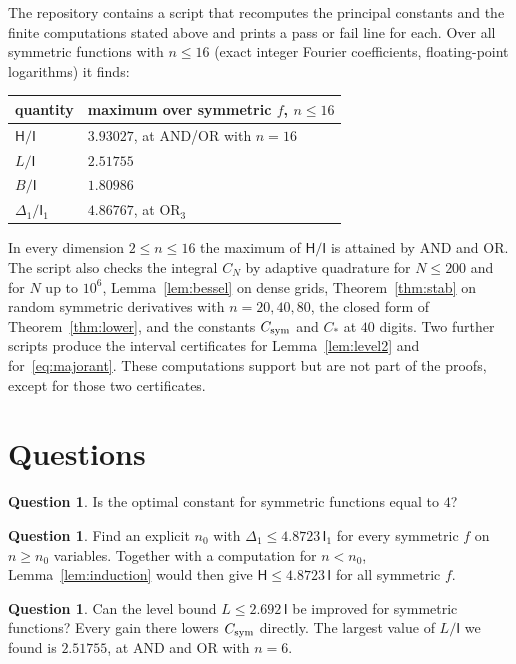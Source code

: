\documentclass[11pt]{amsart}
\theoremstyle{definition}
\newtheorem{question}[theorem]{Question}
\theoremstyle{remark}
\newcommand{\HH}{\mathsf H}
\newcommand{\I}{\mathsf I}
\begin{document}
The repository contains a script that recomputes the principal constants and the finite computations stated above and prints a pass or fail line for each. Over all symmetric functions with $n\le16$ (exact integer Fourier coefficients, floating-point logarithms) it finds:
\begin{center}
\begin{tabular}{@{}ll@{}}
\toprule
quantity & maximum over symmetric $f$, $n\le16$\\
\midrule
$\HH/\I$ & $3.93027$, at AND/OR with $n=16$ \\
$L/\I$ & $2.51755$ \\
$B/\I$ & $1.80986$ \\
$\Delta_1/\I_1$ & $4.86767$, at $\mathrm{OR}_3$ \\
\bottomrule
\end{tabular}
\end{center}
In every dimension $2\le n\le16$ the maximum of $\HH/\I$ is attained by AND and OR. The script also checks the integral $C_N$ by adaptive quadrature for $N\le200$ and for $N$ up to $10^6$, Lemma~\ref{lem:bessel} on dense grids, Theorem~\ref{thm:stab} on random symmetric derivatives with $n=20,40,80$, the closed form of Theorem~\ref{thm:lower}, and the constants $C_{\rm sym}$ and $C_*$ at $40$ digits. Two further scripts produce the interval certificates for Lemma~\ref{lem:level2} and for~\eqref{eq:majorant}. These computations support but are not part of the proofs, except for those two certificates.

\section{Questions}

\begin{question}
Is the optimal constant for symmetric functions equal to $4$?
\end{question}

\begin{question}\label{q:cutoff}
Find an explicit $n_0$ with $\Delta_1\le4.8723\,\I_1$ for every symmetric $f$ on $n\ge n_0$ variables. Together with a computation for $n<n_0$, Lemma~\ref{lem:induction} would then give $\HH\le4.8723\,\I$ for all symmetric $f$.
\end{question}

\begin{question}
Can the level bound $L\le2.692\,\I$ be improved for symmetric functions? Every gain there lowers $C_{\rm sym}$ directly. The largest value of $L/\I$ we found is $2.51755$, at AND and OR with $n=6$.
\end{question}
\end{document}
